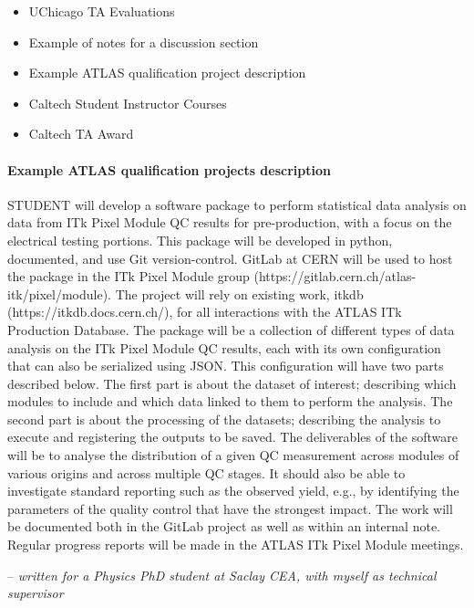 \begin{itemize}
	\item UChicago TA Evaluations
	\item Example of notes for a discussion section
	\item Example ATLAS qualification project description
	\item Caltech Student Instructor Courses
	\item Caltech TA Award
\end{itemize}

\paragraph{Example ATLAS qualification projects description}
\begin{displayquote}
	{STUDENT} will develop a software package to perform statistical data
	analysis on data from ITk Pixel Module QC results for pre-production, with
	a focus on the electrical testing portions. This package will be developed
	in python, documented, and use Git version-control. GitLab at CERN will be
	used to host the package in the ITk Pixel Module group
	(https://gitlab.cern.ch/atlas-itk/pixel/module). The project will rely on
	existing work, itkdb (https://itkdb.docs.cern.ch/), for all interactions
	with the ATLAS ITk Production Database. The package will be a collection of
	different types of data analysis on the ITk Pixel Module QC results, each
	with its own configuration that can also be serialized using JSON. This
	configuration will have two parts described below. The first part is about
	the dataset of interest; describing which modules to include and which data
	linked to them to perform the analysis. The second part is about the
	processing of the datasets; describing the analysis to execute and
	registering the outputs to be saved. The deliverables of the software will
	be to analyse the distribution of a given QC measurement across modules of
	various origins and across multiple QC stages. It should also be able to
	investigate standard reporting such as the observed yield, e.g., by
	identifying the parameters of the quality control that have the strongest
	impact. The work will be documented both in the GitLab project as well as
	within an internal note. Regular progress reports will be made in the ATLAS
	ITk Pixel Module meetings.
\end{displayquote}
-- \textit{written for a Physics PhD student at Saclay CEA, with myself as technical supervisor}

